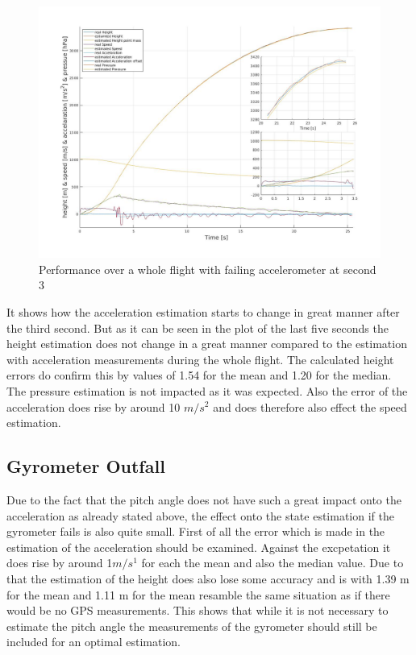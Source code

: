 \begin{figure}[h!]
 \centering
 \includegraphics[width=.8\textwidth]{./Pictures/BestSystemPerformanceAccOutfall.jpg}
 \caption{Performance over a whole flight with failing accelerometer at second 3}
 \label{fig:PerformanceAccOutfall}
\end{figure}

It shows how the acceleration estimation starts to change in great manner after the third second.
But as it can be seen in the plot of the last five seconds the height estimation does not change in a great manner
compared to the estimation with acceleration measurements during the whole flight.
The calculated height errors do confirm this by values of 1.54 for the mean and 1.20 for the median.
The pressure estimation is not impacted as it was expected.
Also the error of the acceleration does rise by around 10 $m/s^2$ and does therefore also effect the speed estimation.

\subsection{Gyrometer Outfall}
Due to the fact that the pitch angle does not have such a great impact onto the acceleration as already stated above,
the effect onto the state estimation if the gyrometer fails is also quite small.
First of all the error which is made in the estimation of the acceleration should be examined.
Against the excpetation it does rise by around 1$m/s^1$ for each the mean and also the median value.
Due to that the estimation of the height does also lose some accuracy and is with 1.39 m for the mean
and 1.11 m for the mean resamble the same situation as if there would be no GPS measurements.
This shows that while it is not necessary to estimate the pitch angle the measurements of the gyrometer should still be included for an optimal estimation.


